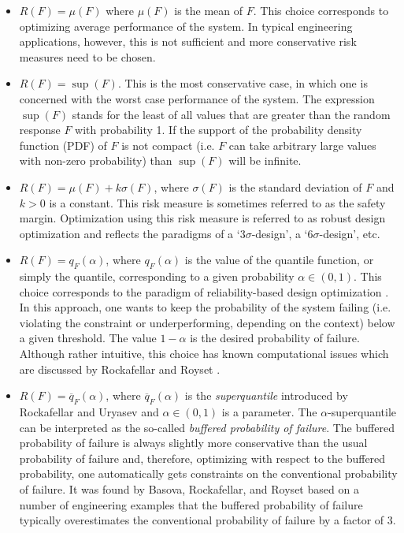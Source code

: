 \documentclass{llncs}
\begin{document}
\begin{itemize}
  \item $R(F)=\mu(F)$ where $\mu(F)$ is the mean of $F$. This choice corresponds to optimizing average performance of the system. In typical engineering applications, however, this is not sufficient and more conservative risk measures need to be chosen.
  \item $R(F)=\sup(F)$. This is the most conservative case, in which one is concerned with the worst case performance of the system. The expression $\sup(F)$ stands for the least of all values that are greater than the random response $F$ with probability 1. If the support of the probability density function (PDF) of $F$ is not compact (i.e. $F$ can take arbitrary large values with non-zero probability) than $\sup(F)$ will be infinite.
  \item $R(F)=\mu(F)+k\sigma(F)$, where $\sigma(F)$ is the standard deviation of $F$ and $k>0$ is a constant. This risk measure is sometimes referred to as the safety margin. Optimization using this risk measure is referred to as robust design optimization \cite{KochYangGu2004,Yao2011,ZhangZhuChenArendt2013} and reflects the paradigms of a ‘$3\sigma$-design’, a ‘$6\sigma$-design’, etc.
  \item $R(F)=q_F(\alpha)$, where $q_F(\alpha)$ is the value of the quantile function, or simply the quantile, corresponding to a given probability $\alpha\in (0,1)$. This choice corresponds to the paradigm of reliability-based design optimization  \cite{AouesChateauneuf2010,Yao2011,YounChoi2004}. In this approach, one wants to keep the probability of the system failing (i.e. violating the constraint or underperforming, depending on the context) below a given threshold. The value $1-\alpha$ is the desired probability of failure. Although rather intuitive, this choice has known computational issues which are discussed by Rockafellar and Royset \cite{RockafellarRoyset2010}.
  \item $R(F)=\overline{q}_F(\alpha)$, where $\overline{q}_F(\alpha)$ is the \textit{superquantile} introduced by Rockafellar and Uryasev \cite{RockafellarUryasev2000} and $\alpha \in (0,1)$ is a parameter. The $\alpha$-superquantile can be interpreted as the so-called \textit{buffered probability of failure}. The buffered probability of failure is always slightly more conservative than the usual probability of failure and, therefore, optimizing with respect to the buffered probability, one automatically gets constraints on the conventional probability of failure. It was found by Basova, Rockafellar, and Royset \cite{BasovaRockafellarRoyset} based on a number of engineering examples that the buffered probability of failure typically overestimates the conventional probability of failure by a factor of 3. 	
\end{itemize}
\end{document}
